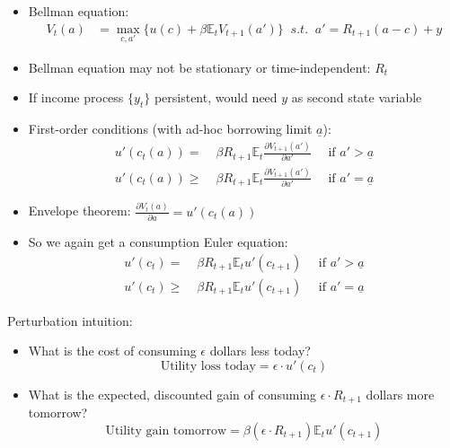 \documentclass[10pt]{beamer}
\begin{document}
\begin{frame}{}
\begin{itemize}
\item Bellman equation:
\begin{align*}
	V_t(a) &= \max_{c, a'} \Big\{ u(c) + \beta \mathbb{E}_t V_{t+1}(a') \Big\} \;\; s.t. \;\; a' = R_{t+1} (a - c) + y
\end{align*}

\item Bellman equation may not be stationary or time-independent: $R_t$

\item If income process $\{y_t\}$ persistent, would need $y$ as second state variable

\item First-order conditions (with ad-hoc borrowing limit $\underline a$):
\begin{align*}
	u'(c_t(a)) = &\; \beta R_{t+1} \mathbb{E}_t \frac{\partial V_{t+1}(a')}{\partial a'} \quad \text{ if }  a' > \underline a \\
	u'(c_t(a)) \geq &\; \beta R_{t+1} \mathbb{E}_t \frac{\partial V_{t+1}(a')}{\partial a'} \quad \text{ if }  a' = \underline a
\end{align*}

\end{itemize}
\end{frame}


\begin{frame}{}
\begin{itemize}
\item Envelope theorem: $\frac{\partial V_t(a)}{\partial a} = u'(c_t(a))$

\item So we again get a consumption Euler equation:
\begin{align*}
	u'(c_t) = &\; \beta R_{t+1} \mathbb{E}_t u'(c_{t+1}) \quad \text{ if }  a' > \underline a \\
	u'(c_t) \geq &\; \beta R_{t+1} \mathbb{E}_t u'(c_{t+1})  \quad \text{ if }  a' = \underline a
\end{align*}
\end{itemize}


\vspace{6mm}
Perturbation intuition:
\begin{itemize}
\item What is the cost of consuming $\epsilon$ dollars less today? 
\begin{equation*}
	\text{Utility loss today} = \epsilon \cdot u'(c_t)
\end{equation*}

\item What is the expected, discounted gain of consuming $\epsilon \cdot R_{t+1}$ dollars more tomorrow?
\begin{equation*}
	\text{Utility gain tomorrow} = \beta (\epsilon \cdot R_{t+1}) \mathbb{E}_t u'(c_{t+1})
\end{equation*}
\end{itemize}

\end{frame}
\end{document}
